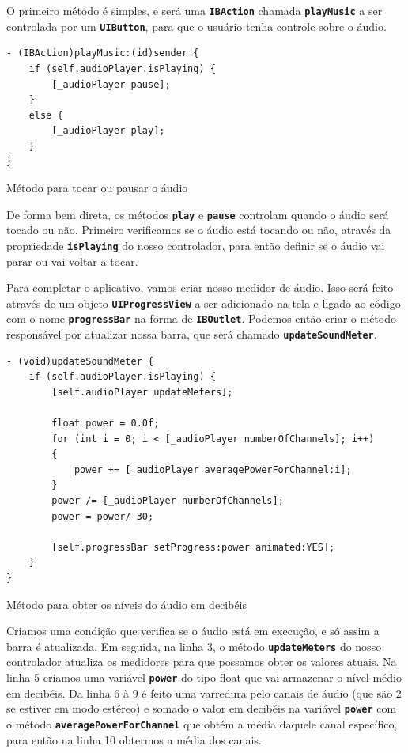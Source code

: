 \documentclass[a4paper,12pt,brazil,oneside]{book}
\begin{document}
O primeiro método é simples, e será uma \texttt{\textbf{IBAction}} chamada \texttt{\textbf{playMusic}} a ser controlada por um \texttt{\textbf{UIButton}}, para que o usuário tenha controle sobre o áudio.

\begin{listing}[H]
\begin{verbatim}
- (IBAction)playMusic:(id)sender {
    if (self.audioPlayer.isPlaying) {
        [_audioPlayer pause];
    }
    else {
        [_audioPlayer play];
    }
}
\end{verbatim}
\caption{Método para tocar ou pausar o áudio}
\end{listing}


De forma bem direta, os métodos \texttt{\textbf{play}} e \texttt{\textbf{pause}} controlam quando o áudio será tocado ou não. Primeiro verificamos se o áudio está tocando ou não, através da propriedade \texttt{\textbf{isPlaying}} do nosso controlador, para então definir se o áudio vai parar ou vai voltar a tocar.

Para completar o aplicativo, vamos criar nosso medidor de áudio. Isso será feito através de um objeto \texttt{\textbf{UIProgressView}} a ser adicionado na tela e ligado ao código com o nome \texttt{\textbf{progressBar}} na forma de \texttt{\textbf{IBOutlet}}. Podemos então criar o método responsável por atualizar nossa barra, que será chamado \texttt{\textbf{updateSoundMeter}}.

\begin{listing}[H]
\begin{verbatim}
- (void)updateSoundMeter {
    if (self.audioPlayer.isPlaying) {
        [self.audioPlayer updateMeters];
    
        float power = 0.0f;
        for (int i = 0; i < [_audioPlayer numberOfChannels]; i++)
        {
            power += [_audioPlayer averagePowerForChannel:i];
        }
        power /= [_audioPlayer numberOfChannels];
        power = power/-30;
        
        [self.progressBar setProgress:power animated:YES];
    }
}
\end{verbatim}
\caption{Método para obter os níveis do áudio em decibéis}
\end{listing}


Criamos uma condição que verifica se o áudio está em execução, e só assim a barra é atualizada. Em seguida, na linha 3, o método \texttt{\textbf{updateMeters}} do nosso controlador atualiza os medidores para que possamos obter os valores atuais. Na linha 5 criamos uma variável \texttt{\textbf{power}} do tipo float que vai armazenar o nível médio em decibéis. Da linha 6 à 9 é feito uma varredura pelo canais de áudio (que são 2 se estiver em modo estéreo) e somado o valor em decibéis na variável \texttt{\textbf{power}} com o método \texttt{\textbf{averagePowerForChannel}} que obtém a média daquele canal específico, para então na linha 10 obtermos a média dos canais.
\end{document}
